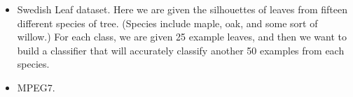 
\begin{itemize}
\item Swedish Leaf dataset. Here we are given the silhouettes of
  leaves from fifteen different species of tree. (Species include
  maple, oak, and some sort of willow.) For each class, we are given
  25 example leaves, and then we want to build a classifier that will
  accurately classify another 50 examples from each species.

\item MPEG7.

\end{itemize}
